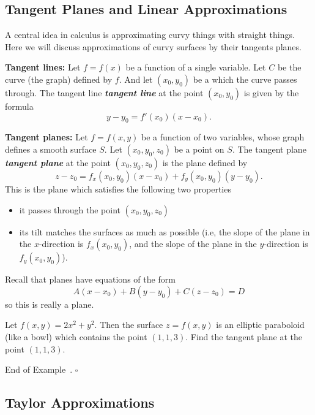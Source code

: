 \documentclass[10pt]{article}
\DeclareRobustCommand{\demph}[1]{%
  \ifmmode
  {\color{Blue}#1}%
  \else
  {\color{Blue}\bfseries\slshape #1}%
  \fi
}
\theoremstyle{definition}
\newtheorem{example}[theorem]{Example}
\renewenvironment{example}
{\begin{oldexample}}
  {\par\smallskip\hfill   End of Example~\theexample. $\square$    \par\end{oldexample}}
\newcommand{\vt}{\vskip 5mm} %
\newcommand{\Fl}{\vt\noindent\textbf} %
\newcommand{\1}[1]{\textbf{1}_{\left[#1\right]}} %
\begin{document}
\subsection{Tangent Planes and Linear Approximations}

A central idea in calculus is approximating curvy things with straight things.
Here we will discuss approximations of curvy surfaces by their tangents planes. 

\Fl{Tangent lines:} Let $f= f(x)$ be a function of a single variable. Let $C$
be the curve (the graph) defined by $f$. And let $(x_{0},y_{0})$ be a which
the curve passes through. The \demph{tangent line} at the point $(x_{0},y_{0})$ is
given by the formula
\begin{equation*}
  y-y_{0} = f'(x_{0})(x-x_{0}).
\end{equation*}


\Fl{Tangent planes:} Let $f=f(x,y)$ be a function of two variables, whose
graph defines a smooth surface $S$. Let $(x_{0},y_{0},z_{0})$ be a point on
$S$. The \demph{tangent plane} at the point $(x_{0},y_{0},z_{0})$ is the plane
defined by
\begin{equation*}
  z-z_{0} = f_{x}(x_{0},y_{0})(x-x_{0})+f_{y}(x_{0},y_{0})(y-y_{0}).
\end{equation*}
This is the plane which satisfies the following two properties
\begin{itemize}
  \item it passes through the point $(x_{0},y_{0},z_{0})$
  \item its tilt matches the surfaces as much as possible (i.e, the slope of
  the plane in the $x$-direction is $f_{x}(x_{0},y_{0})$, and the slope of the
  plane in the $y$-direction is $f_{y}(x_{0},y_{0})$).
\end{itemize}
Recall that planes have equations of the form
\begin{equation*}
  A(x-x_{0})+B(y-y_{0})+C(z-z_{0})=D
\end{equation*}
so this is really a plane. 

\begin{example}
  Let $f(x,y) = 2x^{2}+y^{2}$. Then the surface $z=f(x,y)$ is an elliptic
  paraboloid (like a bowl) which contains the point $(1,1,3)$. Find the
  tangent plane at the point $(1,1,3)$.
\end{example}



\subsection{Taylor Approximations}
\end{document}
